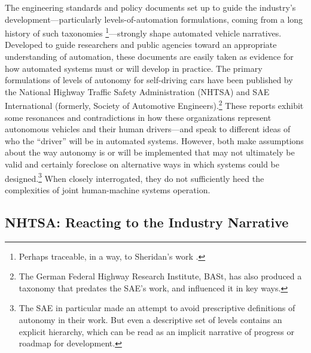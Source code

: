 The engineering standards and
policy documents set up to
guide the industry's development---particularly levels-of-automation
formulations, coming from a long history of such taxonomies
\cite{PSWickens} \cite{SMART} \cite{ALFUS}
\cite{parasuramanW}\footnote{Perhaps traceable, in a way, to   
  Sheridan's work \cite[p. 23]{DSB}.}---strongly shape automated
vehicle narratives. Developed to guide
researchers and public agencies toward an appropriate understanding of
automation, these documents are easily taken
as evidence for how automated systems must or will develop in
practice. The primary formulations of
levels of autonomy for self-driving cars 
have been published by the National Highway Traffic Safety
Administration (NHTSA) and SAE International (formerly, Society of
Automotive Engineers).\footnote{The German Federal Highway Research
  Institute, BASt, 
 has also produced a taxonomy that predates the SAE's work, and
 influenced it in key ways.}
These reports exhibit some resonances and contradictions in how these
organizations represent autonomous vehicles and their human
drivers---and speak to different ideas of who the ``driver'' will be
in automated systems. However, both make assumptions about
the way autonomy is or will be implemented that may not ultimately be
valid and certainly foreclose on alternative ways in
which systems could be designed.\footnote{The SAE in particular
  made an attempt to avoid prescriptive definitions of autonomy in
  their work. But even a descriptive set of levels contains an
  explicit hierarchy, which can be read as an implicit narrative of
  progress or roadmap for development.} When closely
interrogated, they do not sufficiently heed the
complexities of joint human-machine systems operation.



\subsection{NHTSA: Reacting to the Industry Narrative}

